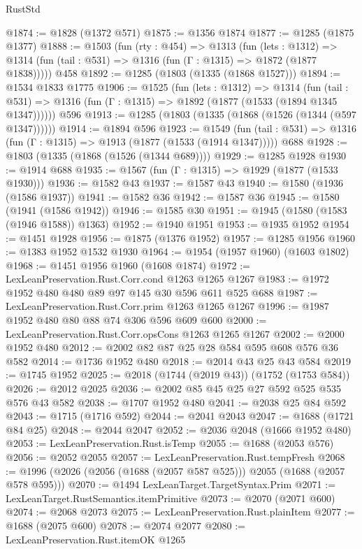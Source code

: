 \begin{lexlean}{RustStd}
\begin{coremodule}
@1874 := @1828 (@1372 @571)
@1875 := @1356 @1874
@1877 := @1285 (@1875 @1377)
@1888 := @1503
    (fun (rty : @454) =>
    @1313
      (fun (lets : @1312) =>
      @1314 (fun (tail : @531) => @1316 (fun (Γ : @1315) => @1872 (@1877 @1838)))))
    @458
@1892 := @1285 (@1803 (@1335 (@1868 @1527)))
@1894 := @1534 @1833 @1775
@1906 := @1525
    (fun (lets : @1312) =>
    @1314
      (fun (tail : @531) => @1316 (fun (Γ : @1315) => @1892 (@1877 (@1533 (@1894 @1345 @1347))))))
    @596
@1913 := @1285 (@1803 (@1335 (@1868 (@1526 (@1344 (@597 @1347))))))
@1914 := @1894 @596
@1923 := @1549
    (fun (tail : @531) => @1316 (fun (Γ : @1315) => @1913 (@1877 (@1533 (@1914 @1347)))))
    @688
@1928 := @1803 (@1335 (@1868 (@1526 (@1344 @689))))
@1929 := @1285 @1928
@1930 := @1914 @688
@1935 := @1567 (fun (Γ : @1315) => @1929 (@1877 (@1533 @1930)))
@1936 := @1582 @43
@1937 := @1587 @43
@1940 := @1580 (@1936 (@1586 @1937))
@1941 := @1582 @36
@1942 := @1587 @36
@1945 := @1580 (@1941 (@1586 @1942))
@1946 := @1585 @30
@1951 := @1945 (@1580 (@1583 (@1946 @1588)) @1363)
@1952 := @1940 @1951
@1953 := @1935 @1952
@1954 := @1451 @1928
@1956 := @1875 (@1376 @1952)
@1957 := @1285 @1956
@1960 := @1383 @1952 @1532 @1930
@1964 := @1954 (@1957 @1960) (@1603 @1802)
@1968 := @1451 @1956 @1960 (@1608 @1874)
@1972 := LexLeanPreservation.Rust.Corr.cond @1263 @1265 @1267
@1983 := @1972 @1952 @480 @480 @89 @97 @145 @30 @596 @611 @525 @688
@1987 := LexLeanPreservation.Rust.Corr.prim @1263 @1265 @1267
@1996 := @1987 @1952 @480 @80 @88 @74 @306 @596 @609 @600
@2000 := LexLeanPreservation.Rust.Corr.opsCons @1263 @1265 @1267
@2002 := @2000 @1952 @480
@2012 := @2002 @82 @87 @25 @28 @584 @595 @608 @576 @36 @582
@2014 := @1736 @1952 @480
@2018 := @2014 @43 @25 @43 @584
@2019 := @1745 @1952
@2025 := @2018 (@1744 (@2019 @43)) (@1752 (@1753 @584))
@2026 := @2012 @2025
@2036 := @2002 @85 @45 @25 @27 @592 @525 @535 @576 @43 @582
@2038 := @1707 @1952 @480
@2041 := @2038 @25 @84 @592
@2043 := @1715 (@1716 @592)
@2044 := @2041 @2043
@2047 := @1688 (@1721 @84 @25)
@2048 := @2044 @2047
@2052 := @2036 @2048 (@1666 @1952 @480)
@2053 := LexLeanPreservation.Rust.isTemp
@2055 := @1688 (@2053 @576)
@2056 := @2052 @2055
@2057 := LexLeanPreservation.Rust.tempFresh
@2068 := @1996 (@2026 (@2056 (@1688 (@2057 @587 @525))) @2055 (@1688 (@2057 @578 @595)))
@2070 := @1494 LexLeanTarget.TargetSyntax.Prim
@2071 := LexLeanTarget.RustSemantics.itemPrimitive
@2073 := @2070 (@2071 @600)
@2074 := @2068 @2073
@2075 := LexLeanPreservation.Rust.plainItem
@2077 := @1688 (@2075 @600)
@2078 := @2074 @2077
@2080 := LexLeanPreservation.Rust.itemOK @1265

\end{coremodule}
\end{lexlean}
